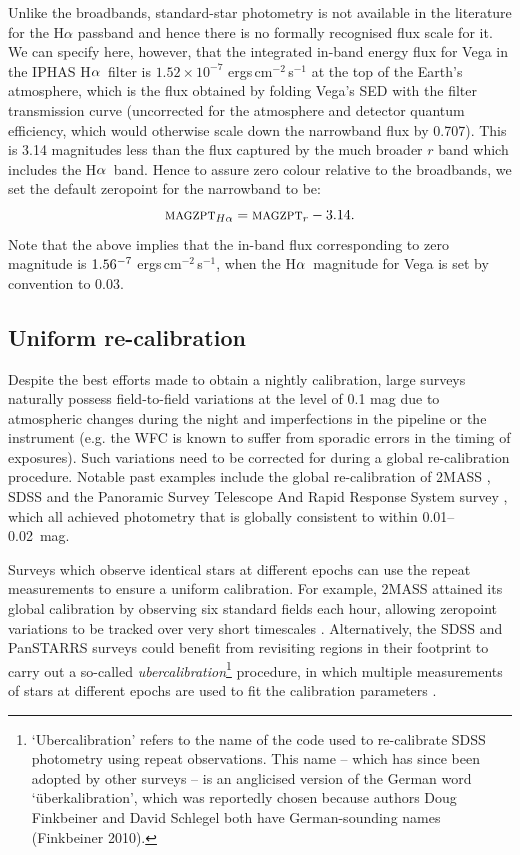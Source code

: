 \documentclass[useAMS,usenatbib]{mn2e}
\def\ha{\mbox{H$\rm \alpha$}}
\begin{document}
Unlike the broadbands, 
standard-star photometry is not available in the literature 
for the H$\alpha$ passband
and hence there is no formally recognised flux scale 
for it.
We can specify here, however, 
that the integrated in-band energy flux for Vega 
in the IPHAS \ha\ filter 
is $1.52 \times 10^{-7}$ ergs\,cm$^{-2}$\,s$^{-1}$ 
at the top of the Earth's atmosphere,
which is the flux obtained by folding 
Vega's SED with the filter transmission curve 
(uncorrected for the atmosphere and detector quantum efficiency,
which would otherwise scale down the narrowband flux by 0.707).
This is 3.14 magnitudes less than the flux captured 
by the much broader $r$ band
which includes the \ha\ band.
Hence to assure zero colour relative to the broadbands,
we set the default zeropoint for the narrowband to be:
\begin{equation}
\textsc{magzpt}_{H\alpha} = \textsc{magzpt}_r - 3.14.
\label{eqn:zpha}
\end{equation}
Note that the above implies that the in-band flux corresponding to
zero magnitude is $1.56 \time 10^{-7}$ ergs\,cm$^{-2}$\,s$^{-1}$,
when the \ha\ magnitude for Vega is set by convention to 0.03.


\subsection{Uniform re-calibration}

Despite the best efforts made to obtain a nightly calibration,
large surveys naturally possess field-to-field variations
at the level of 0.1 mag
due to atmospheric changes during the night
and imperfections in the pipeline or the instrument
(e.g. the WFC is known to suffer from sporadic errors
in the timing of exposures).
Such variations need to be corrected for 
during a global re-calibration procedure.
Notable past examples include the global re-calibration 
of 2MASS \citep[][]{Nikolaev2000},
SDSS \citep[][]{Padmanabhan2008}
and the Panoramic Survey Telescope 
And Rapid Response System survey \citep[Pan-STARRS;][]{Schlafly2012},
which all achieved photometry 
that is globally consistent to within 0.01--0.02~mag.

Surveys which observe identical stars at different epochs
can use the repeat measurements to ensure a uniform calibration.
For example, 2MASS attained its global calibration
by observing six standard fields each hour, 
allowing zeropoint variations to be tracked 
over very short timescales \citep{Nikolaev2000}.
Alternatively, the SDSS and PanSTARRS surveys could benefit
from revisiting regions in their footprint to 
carry out a so-called \emph{ubercalibration}\footnote{`Ubercalibration'
refers to the name of the code used to re-calibrate SDSS photometry
using repeat observations. 
This name -- which has since been adopted by other surveys --
is an anglicised version of the German word `\"uberkalibration',
which was reportedly chosen because authors Doug Finkbeiner and David Schlegel
both have German-sounding names (Finkbeiner 2010).} procedure,
in which multiple measurements of stars at different epochs
are used to fit the calibration parameters
\citep[e.g.][]{Ivezic2007,Padmanabhan2008,Schlafly2012}.
\end{document}
